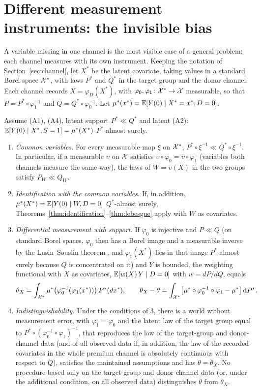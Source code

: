 \section{Different measurement instruments: the invisible bias}\label{sec:instruments}

A variable missing in one channel is the most visible case of a general problem: each channel measures with its own instrument. Keeping the notation of Section~\ref{sec:channel}, let $X^*$ be the latent covariate, taking values in a standard Borel space $\mathcal{X}^*$, with laws $P^*$ and $Q^*$ in the target group and the donor channel. Each channel records $X=\varphi_D(X^*)$, with $\varphi_0,\varphi_1\colon\mathcal{X}^*\to\mathcal{X}$ measurable, so that $P=P^*\circ\varphi_1^{-1}$ and $Q=Q^*\circ\varphi_0^{-1}$. Let $\mu^*(x^*)=\mathbb{E}[Y(0)\mid X^*=x^*,D=0]$.

\begin{theorem}\label{thm:measurement}
Assume (A1), (A4), latent support $P^*\ll Q^*$ and latent (A2): $\mathbb{E}[Y(0)\mid X^*,S=1]=\mu^*(X^*)$ $P^*$-almost surely.
\begin{enumerate}
  \item \emph{Common variables.} For every measurable map $\xi$ on $\mathcal{X}^*$, $P^*\circ\xi^{-1}\ll Q^*\circ\xi^{-1}$. In particular, if a measurable $\upsilon$ on $\mathcal{X}$ satisfies $\upsilon\circ\varphi_0=\upsilon\circ\varphi_1$ (variables both channels measure the same way), the laws of $W=\upsilon(X)$ in the two groups satisfy $P_W\ll Q_W$.
  \item \emph{Identification with the common variables.} If, in addition, $\mu^*(X^*)=\mathbb{E}[Y(0)\mid W,D=0]$ $Q^*$-almost surely, Theorems~\ref{thm:identification}--\ref{thm:lebesgue} apply with $W$ as covariates.
  \item \emph{Differential measurement with support.} If $\varphi_0$ is injective and $P\ll Q$ (on standard Borel spaces, $\varphi_0$ then has a Borel image and a measurable inverse by the Lusin--Souslin theorem \citep[Corollary 15.2]{kechris1995}, and $\varphi_1(X^*)$ lies in that image $P^*$-almost surely because $Q$ is concentrated on it) and $Y$ is bounded, the weighting functional with $X$ as covariates, $\mathbb{E}[w(X)\,Y\mid D=0]$ with $w=dP/dQ$, equals
  \[
  \theta_X=\int_{\mathcal{X}^*}\mu^*\bigl(\varphi_0^{-1}(\varphi_1(x^*))\bigr)\,P^*(dx^*),\qquad
  \theta_X-\theta=\int_{\mathcal{X}^*}\bigl[\mu^*\circ\varphi_0^{-1}\circ\varphi_1-\mu^*\bigr]\,\mathrm{d} P^*.
  \]
  \item \emph{Indistinguishability.} Under the conditions of 3, there is a world without measurement error, with $\varphi_1=\varphi_0$ and the latent law of the target group equal to $P^*\circ(\varphi_0^{-1}\circ\varphi_1)^{-1}$, that reproduces the law of the target-group and donor-channel data (and of all observed data if, in addition, the law of the recorded covariates in the whole premium channel is absolutely continuous with respect to $Q$), satisfies the maintained assumptions and has $\theta=\theta_X$. No procedure based only on the target-group and donor-channel data (or, under the additional condition, on all observed data) distinguishes $\theta$ from $\theta_X$.
\end{enumerate}
\end{theorem}
